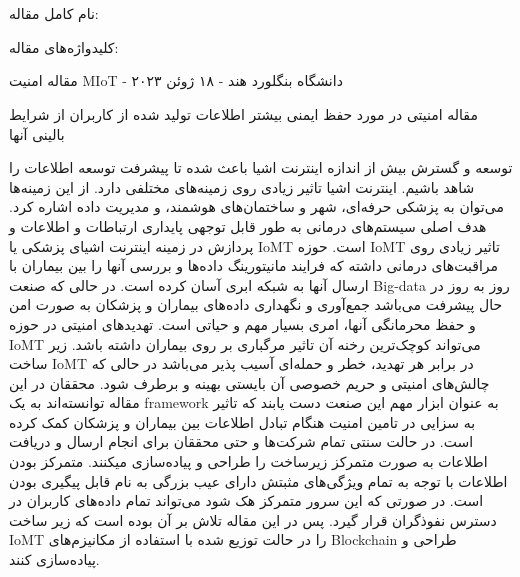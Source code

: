 \documentclass[10pt, a4paper]{article}
\begin{document}
\newpage

\section{}

نام کامل مقاله: 

کلیدواژه‌های مقاله:

مقاله امنیت MIoT - دانشگاه بنگلورد هند - ۱۸ ژوئن ۲۰۲۳

مقاله امنیتی در مورد حفظ ایمنی بیشتر اطلاعات تولید شده از کاربران از شرایط
بالینی آنها

توسعه و گسترش بیش از اندازه اینترنت اشیا باعث شده تا پیشرفت توسعه اطلاعات را
شاهد باشیم. اینترنت اشیا تاثیر زیادی روی زمینه‌های مختلفی دارد. از این زمینه‌ها
می‌توان به پزشکی حرفه‌ای، شهر و ساختمان‌های هوشمند، و مدیریت داده اشاره کرد. هدف
اصلی سیستم‌های درمانی به طور قابل توجهی پایداری ارتباطات و اطلاعات و پردازش در
زمینه اینترنت اشیای پزشکی یا IoMT است.  حوزه IoMT تاثیر زیادی روی مراقبت‌های
درمانی داشته که فرایند مانیتورینگ داده‌ها و بررسی آنها را بین بیماران با ارسال
آنها به شبکه ابری آسان کرده است. در حالی که صنعت Big-data روز به روز در حال
پیشرفت می‌باشد جمع‌آوری و نگهداری داده‌های بیماران و پزشکان به صورت امن و حفظ
محرمانگی آنها، امری بسیار مهم و حیاتی است. تهدید‌های امنیتی در حوزه IoMT
می‌تواند کوچک‌ترین رخنه آن تاثیر مرگباری بر روی بیماران داشته باشد. زیر ساخت
IoMT در برابر هر تهدید، خطر و حمله‌ای آسیب پذیر می‌باشد در حالی که چالش‌های
امنیتی و حریم خصوصی آن بایستی بهینه و برطرف شود. محققان در این مقاله توانسته‌اند
به یک framework به عنوان ابزار مهم این صنعت دست یابند که تاثیر به سزایی در تامین
امنیت هنگام تبادل اطلاعات بین بیماران و پزشکان کمک کرده است. در حالت سنتی تمام
شرکت‌ها و حتی محققان برای انجام ارسال و دریافت اطلاعات به صورت متمرکز زیرساخت را
طراحی و پیاده‌سازی میکنند. متمرکز بودن اطلاعات با توجه به تمام ویژگی‌های مثبتش
دارای عیب بزرگی به نام قابل پیگیری بودن است. در صورتی که این سرور متمرکز هک شود
می‌تواند تمام داده‌های کاربران در دسترس نفوذگران قرار گیرد. پس در این مقاله تلاش
بر آن بوده است که زیر ساخت IoMT را در حالت توزیع شده با استفاده از مکانیزم‌های
Blockchain طراحی و پیاده‌سازی کنند.
\end{document}
